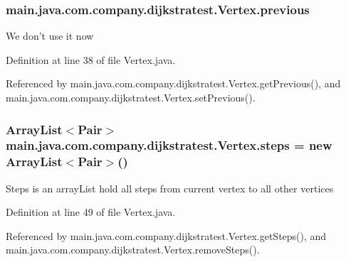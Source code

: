 \hypertarget{classmain_1_1java_1_1com_1_1company_1_1dijkstratest_1_1_vertex_a748206c2f117a19e74469881e71b2415}{
\subsubsection[{previous}]{ main.\-java.\-com.\-company.\-dijkstratest.\-Vertex.\-previous\hspace{0.3cm}{\ttfamily [private]}}}\label{classmain_1_1java_1_1com_1_1company_1_1dijkstratest_1_1_vertex_a748206c2f117a19e74469881e71b2415}
We don't use it now 

Definition at line 38 of file Vertex.\-java.



Referenced by main.\-java.\-com.\-company.\-dijkstratest.\-Vertex.\-get\-Previous(), and main.\-java.\-com.\-company.\-dijkstratest.\-Vertex.\-set\-Previous().

\hypertarget{classmain_1_1java_1_1com_1_1company_1_1dijkstratest_1_1_vertex_a21bd658cd178bffda298570f221cdfce}{
\subsubsection[{steps}]{\setlength{\rightskip}{0pt plus 5cm}Array\-List$<${\bf Pair}$>$ main.\-java.\-com.\-company.\-dijkstratest.\-Vertex.\-steps = new Array\-List$<${\bf Pair}$>$()\hspace{0.3cm}{\ttfamily [private]}}}\label{classmain_1_1java_1_1com_1_1company_1_1dijkstratest_1_1_vertex_a21bd658cd178bffda298570f221cdfce}
Steps is an array\-List hold all steps from current vertex to all other vertices 

Definition at line 49 of file Vertex.\-java.



Referenced by main.\-java.\-com.\-company.\-dijkstratest.\-Vertex.\-get\-Steps(), and main.\-java.\-com.\-company.\-dijkstratest.\-Vertex.\-remove\-Steps().

